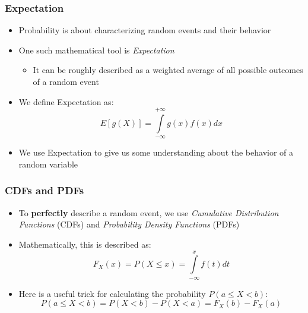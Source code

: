 \documentclass[10pt]{beamer}
\begin{document}

\frame
{
  \frametitle{Expectation}

  \begin{itemize}
   \item Probability is about characterizing random events and their behavior
   \item One such mathematical tool is \textit{Expectation}
   \begin{itemize}
    \item It can be roughly described as a weighted average of all possible outcomes of a random event
   \end{itemize}
   \item We define Expectation as:
   \begin{equation}
    E[g(X)]=\int\limits_{-\infty}^{+\infty}g(x)f(x)dx
   \end{equation}
    \item We use Expectation to give us some understanding about the behavior of a random variable
  \end{itemize}


  }




\frame
{
  \frametitle{CDFs and PDFs}

  \begin{itemize}
   \item To \textbf{perfectly} describe a random event, we use \textit{Cumulative Distribution Functions} (CDFs) and \textit{Probability Density Functions} (PDFs)
   \item Mathematically, this is described as:
   \begin{equation}
    F_X(x)=P(X\le{x})=\int\limits_{-\infty}^{x}f(t)dt
   \end{equation}
   \item Here is a useful trick for calculating the probability $P(a\le{X}<b)$:
   \begin{equation}
    P(a\le{X}<b)=P(X<b)-P(X<a)=F_X(b)-F_X(a)
   \end{equation}
  \end{itemize}

  }


\end{document}
